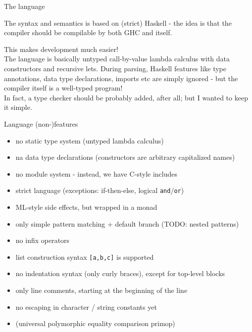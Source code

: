 \documentclass{beamer}
\begin{document}

\begin{frame}{The language}

The syntax and semantics is based on (strict) Haskell - the idea is that the compiler
should be compilable by both GHC and itself.

This makes development much easier!\\[20pt]

The language is basically untyped call-by-value lambda calculus with data constructors
and recursive lets.
During parsing, Haskell features like type annotations, data type declarations, imports etc
are simply ignored - but the compiler itself is a well-typed program!\\[20pt]

In fact, a type checker should be probably added, after all; but I wanted to keep it simple.

\end{frame}


\begin{frame}{Language (non-)features}

{\small
\begin{itemize}
\item no static type system (untyped lambda calculus) 
\item na data type declarations (constructors are arbitrary capitalized names)
\item no module system - instead, we have C-style includes
\item strict language (exceptions: if-then-else, logical {\tt and}/{\tt or})
\item ML-style side effects, but wrapped in a monad
\item only simple pattern matching + default branch (TODO: nested patterns)
\item no infix operators
\item list construction syntax {\tt [a,b,c]} is supported
\item no indentation syntax (only curly braces), except for top-level blocks
\item only line comments, starting at the beginning of the line
\item no escaping in character / string constants yet
\item (universal polymorphic equality comparison primop)
\end{itemize}
}

\end{frame}
\end{document}
